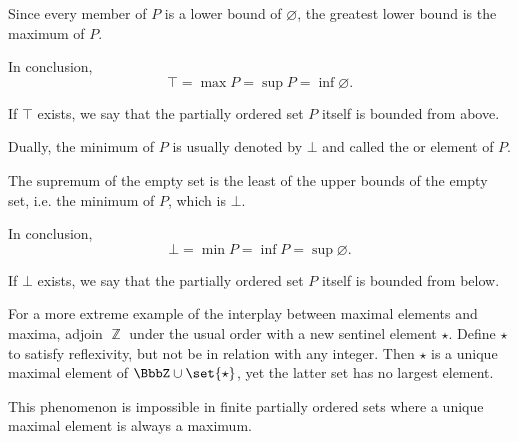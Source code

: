 \begin{definition}
\begin{thmenum}
\begin{minipage}[t]{0.45\textwidth}
      Since every member of \( P \) is a lower bound of \( \varnothing \), the greatest lower bound is the maximum of \( P \).

      In conclusion,
      \begin{equation*}
        \top = \max P = \sup P = \inf \varnothing.
      \end{equation*}

      If \( \top \) exists, we say that the partially ordered set \( P \) itself is bounded from above.
    \end{minipage}
    \hspace{0.02\textwidth}
    \begin{minipage}[t]{0.45\textwidth}
      Dually, the minimum of \( P \) is usually denoted by \( \bot \) and called the  or  element of \( P \).

      The supremum of the empty set is the least of the upper bounds of the empty set, i.e. the minimum of \( P \), which is \( \bot \).

      In conclusion,
      \begin{equation*}
        \bot = \min P = \inf P = \sup \varnothing.
      \end{equation*}

      If \( \bot \) exists, we say that the partially ordered set \( P \) itself is bounded from below.
    \end{minipage}
  \end{thmenum}
\end{definition}

\begin{example}\label{ex:unique_maximal_element_that_is_not_maximum}
  For a more extreme example of the interplay between maximal elements and maxima, adjoin \( \BbbZ \) under the usual order with a new sentinel element \( \star \). Define \( \star \) to satisfy reflexivity, but not be in relation with any integer. Then \( \star \) is a unique maximal element of \( \BbbZ \cup \set{ \star } \), yet the latter set has no largest element.

  This phenomenon is impossible in finite partially ordered sets where a unique maximal element is always a maximum.
\end{example}

